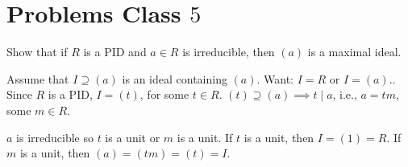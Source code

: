 \documentclass[10pt, a4paper]{article}
\begin{document}
\newpage

\section{Problems Class \texorpdfstring{$5$}{}}

\begin{problem}
    Show that if $R$ is a PID and $a \in R$ is irreducible,
    then $(a)$ is a maximal ideal.

    \begin{solution}
        Assume that $I \supseteq (a)$ is an ideal containing $(a)$.
        Want:
        $I = R$ or $I = (a)$..
        Since $R$ is a PID,
        $I = (t)$,
        for some $t \in R$.
        $(t) \supseteq (a) \implies t \mid a$,
        i.e.,
        $a = tm$,
        some $m \in R$.

        $a$ is irreducible so $t$ is a unit or $m$ is a unit.
        If $t$ is a unit,
        then $I = (1) = R$.
        If $m$ is a unit,
        then $(a) = (tm) = (t) = I$.
    \end{solution}
\end{problem}
\end{document}
